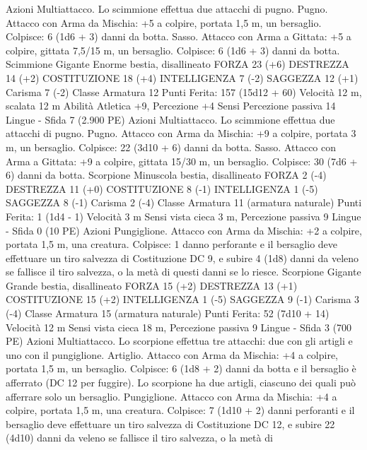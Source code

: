 \begin{multicols}{2}
Azioni
Multiattacco. Lo scimmione effettua due attacchi di pugno.
Pugno. Attacco con Arma da Mischia: +5 a colpire, portata 1,5
m, un bersaglio.
Colpisce: 6 (1d6 + 3) danni da botta.
Sasso. Attacco con Arma a Gittata: +5 a colpire, gittata 7,5/15
m, un bersaglio.
Colpisce: 6 (1d6 + 3) danni da botta.
Scimmione Gigante
Enorme bestia, disallineato
FORZA 23 (+6)
DESTREZZA 14 (+2)
COSTITUZIONE 18 (+4)
INTELLIGENZA 7 (-2)
SAGGEZZA 12 (+1)
Carisma 7 (-2)
Classe Armatura 12
\hspace*{0pt}\hfill{Punti Ferita}: 157 (15d12 + 60)
Velocità 12 m, scalata 12 m
Abilità Atletica +9, Percezione +4
Sensi Percezione passiva 14
Lingue -
Sfida 7 (2.900 PE)
Azioni
Multiattacco. Lo scimmione effettua due attacchi di pugno.
Pugno. Attacco con Arma da Mischia: +9 a colpire, portata 3 m,
un bersaglio.
Colpisce: 22 (3d10 + 6) danni da botta.
Sasso. Attacco con Arma a Gittata: +9 a colpire, gittata 15/30 m,
un bersaglio.
Colpisce: 30 (7d6 + 6) danni da botta.
Scorpione
Minuscola bestia, disallineato
FORZA 2 (-4)
DESTREZZA 11 (+0)
COSTITUZIONE 8 (-1)
INTELLIGENZA 1 (-5)
SAGGEZZA 8 (-1)
Carisma 2 (-4)
Classe Armatura 11 (armatura naturale)
\hspace*{0pt}\hfill{Punti Ferita}: 1 (1d4 - 1)
Velocità 3 m
Sensi vista cieca 3 m, Percezione passiva 9
Lingue -
Sfida 0 (10 PE)
Azioni
Pungiglione. Attacco con Arma da Mischia: +2 a colpire, portata
1,5 m, una creatura.
Colpisce: 1 danno perforante e il bersaglio deve effettuare un tiro
salvezza di Costituzione DC 9, e subire 4 (1d8) danni da veleno
se fallisce il tiro salvezza, o la metà di questi danni se lo riesce.
Scorpione Gigante
Grande bestia, disallineato
FORZA 15 (+2)
DESTREZZA 13 (+1)
COSTITUZIONE 15 (+2)
INTELLIGENZA 1 (-5)
SAGGEZZA 9 (-1)
Carisma 3 (-4)
Classe Armatura 15 (armatura naturale)
\hspace*{0pt}\hfill{Punti Ferita}: 52 (7d10 + 14)
Velocità 12 m
Sensi vista cieca 18 m, Percezione passiva 9
Lingue -
Sfida 3 (700 PE)
Azioni
Multiattacco. Lo scorpione effettua tre attacchi: due con gli
artigli e uno con il pungiglione.
Artiglio. Attacco con Arma da Mischia: +4 a colpire, portata 1,5
m, un bersaglio.
Colpisce: 6 (1d8 + 2) danni da botta e il bersaglio è afferrato
(DC 12 per fuggire). Lo scorpione ha due artigli, ciascuno dei
quali può afferrare solo un bersaglio.
Pungiglione. Attacco con Arma da Mischia: +4 a colpire, portata
1,5 m, una creatura.
Colpisce: 7 (1d10 + 2) danni perforanti e il bersaglio deve
effettuare un tiro salvezza di Costituzione DC 12, e subire 22
(4d10) danni da veleno se fallisce il tiro salvezza, o la metà di

\end{multicols}
